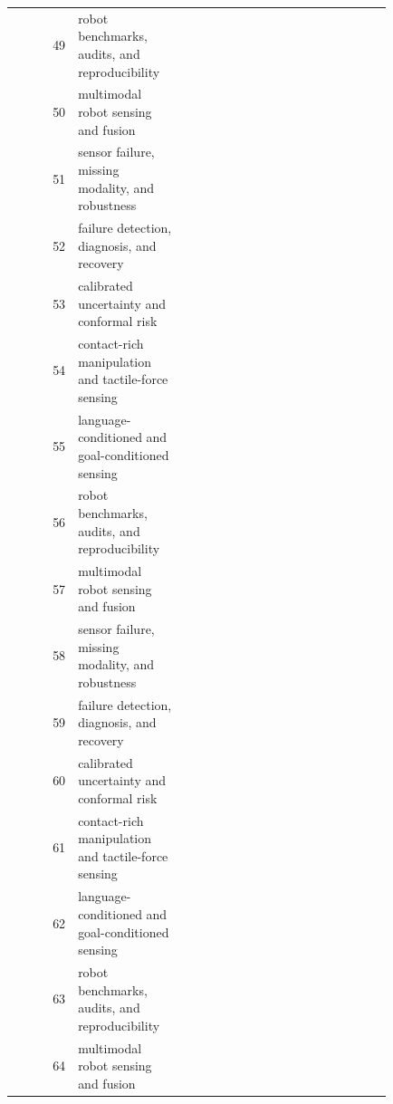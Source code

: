 \documentclass{article}
\begin{document}
\begin{longtable}{@{}r p{0.28\linewidth} p{0.55\linewidth}@{}}
49 & robot benchmarks, audits, and reproducibility & \citep{sokoowski2022defining145,huda2022wireless146,hakim2025evaluation147} \\
50 & multimodal robot sensing and fusion & \citep{seba2024prediction148,anes2018a149,bajaj2023recipes150} \\
51 & sensor failure, missing modality, and robustness & \citep{hou20233d151,liu2023an152,ni2024a153} \\
52 & failure detection, diagnosis, and recovery & \citep{liu2018towards154,jalal2020automatic155,graham2010spatial156} \\
53 & calibrated uncertainty and conformal risk & \citep{bhatt2025realworld157,abdallah2023anomaly158,huang2022failurerobust159} \\
54 & contact-rich manipulation and tactile-force sensing & \citep{fang2023robust160,yin2024ultrahigh161,cai2020probabilistic162} \\
55 & language-conditioned and goal-conditioned sensing & \citep{li2024multiaxis163,nie2023a164,lu2021ganbased165} \\
56 & robot benchmarks, audits, and reproducibility & \citep{zhao2023intelligent166,andrussow2023minsight167,sakib2025star168} \\
57 & multimodal robot sensing and fusion & \citep{abad2020visuotactile169,hong2022radarslam170,meyer2022users171} \\
58 & sensor failure, missing modality, and robustness & \citep{wang2026flexible172,zhou2023tacsuit173,heydarzadeh2017a174} \\
59 & failure detection, diagnosis, and recovery & \citep{tsuji2021sensor175,ham2022porous176,adansdester2020enabling177} \\
60 & calibrated uncertainty and conformal risk & \citep{brodermann2025cafuser178,mun2024multidegreeoffreedom179,kulkarni2023leveraging180} \\
61 & contact-rich manipulation and tactile-force sensing & \citep{marrades2021planning181,allgeuer2024when182,rahman2022svin2183} \\
62 & language-conditioned and goal-conditioned sensing & \citep{nakisa2020automatic184,mahmud2023design185,gay2012pad186} \\
63 & robot benchmarks, audits, and reproducibility & \citep{liu2025likability187,izhaq2025risk188,athar2023vistac189} \\
64 & multimodal robot sensing and fusion & \citep{tapia2020makesense190,maniscalco2017robust191,yim2024electromagnetic192} \\

\end{longtable}
\end{document}
